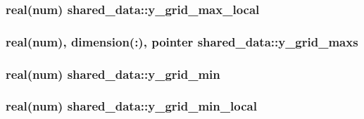 \subsubsection[{\texorpdfstring{y\+\_\+grid\+\_\+max\+\_\+local}{y_grid_max_local}}]{\setlength{\rightskip}{0pt plus 5cm}real(num) shared\+\_\+data\+::y\+\_\+grid\+\_\+max\+\_\+local}\hypertarget{namespaceshared__data_a2690e59dee9f1fae66f0a6d9abf19b88}{}\label{namespaceshared__data_a2690e59dee9f1fae66f0a6d9abf19b88}
\subsubsection[{\texorpdfstring{y\+\_\+grid\+\_\+maxs}{y_grid_maxs}}]{\setlength{\rightskip}{0pt plus 5cm}real(num), dimension(\+:), pointer shared\+\_\+data\+::y\+\_\+grid\+\_\+maxs}\hypertarget{namespaceshared__data_ad3b97b7b23eb4f1708bf6934787c3bc9}{}\label{namespaceshared__data_ad3b97b7b23eb4f1708bf6934787c3bc9}
\subsubsection[{\texorpdfstring{y\+\_\+grid\+\_\+min}{y_grid_min}}]{\setlength{\rightskip}{0pt plus 5cm}real(num) shared\+\_\+data\+::y\+\_\+grid\+\_\+min}\hypertarget{namespaceshared__data_a427f8d5d09444c1a0e5a4cfac1821143}{}\label{namespaceshared__data_a427f8d5d09444c1a0e5a4cfac1821143}
\subsubsection[{\texorpdfstring{y\+\_\+grid\+\_\+min\+\_\+local}{y_grid_min_local}}]{\setlength{\rightskip}{0pt plus 5cm}real(num) shared\+\_\+data\+::y\+\_\+grid\+\_\+min\+\_\+local}\hypertarget{namespaceshared__data_ae639d9c6de4b202530ffc9c74cfaf75b}{}\label{namespaceshared__data_ae639d9c6de4b202530ffc9c74cfaf75b}
